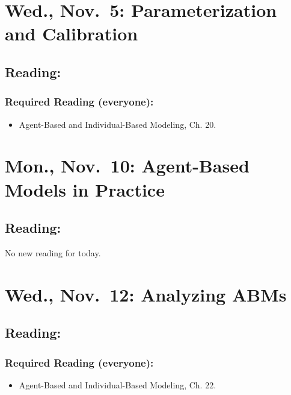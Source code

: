 \documentclass[
]{article}
\providecommand{\tightlist}{%
  \setlength{\itemsep}{0pt}\setlength{\parskip}{0pt}}
\begin{document}
\section{Wed., Nov.~5: Parameterization and
Calibration}\label{wed.-nov.-5-parameterization-and-calibration}

\subsection{Reading:}\label{reading-21}

\subsubsection{Required Reading
(everyone):}\label{required-reading-everyone-18}

\begin{itemize}
\tightlist
\item
  Agent-Based and Individual-Based Modeling, Ch. 20.
\end{itemize}

\section{Mon., Nov.~10: Agent-Based Models in
Practice}\label{mon.-nov.-10-agent-based-models-in-practice}

\subsection{Reading:}\label{reading-22}

No new reading for today.

\section{Wed., Nov.~12: Analyzing
ABMs}\label{wed.-nov.-12-analyzing-abms}

\subsection{Reading:}\label{reading-23}

\subsubsection{Required Reading
(everyone):}\label{required-reading-everyone-19}

\begin{itemize}
\tightlist
\item
  Agent-Based and Individual-Based Modeling, Ch. 22.
\end{itemize}
\end{document}
